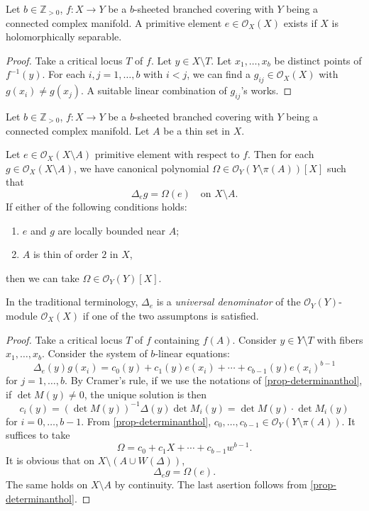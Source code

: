 \begin{corollary}\label{cor-existenceprimi}
    Let $b\in \mathbb{Z}_{>0}$, $f:X\rightarrow Y$ be a $b$-sheeted branched covering with $Y$ being a connected complex manifold. A primitive element $e\in \mathcal{O}_X(X)$ exists if $X$ is holomorphically separable.
\end{corollary}
\begin{proof}
    Take a critical locus $T$ of $f$. 
    Let $y\in X\setminus T$. Let $x_1,\ldots,x_b$ be distinct points of $f^{-1}(y)$. For each $i,j=1,\ldots,b$ with $i<j$, we can find a $g_{ij}\in \mathcal{O}_X(X)$ with $g(x_i)\neq g(x_j)$. A suitable linear combination of $g_{ij}$'s works.
\end{proof}

\begin{proposition}\label{prop-univdenor}
    Let $b\in \mathbb{Z}_{>0}$, $f:X\rightarrow Y$ be a $b$-sheeted branched covering with $Y$ being a connected complex manifold. Let $A$ be a thin set in $X$. 

    Let $e\in \mathcal{O}_X(X\setminus A)$ primitive element with respect to $f$.
    Then for each $g\in \mathcal{O}_X(X\setminus A)$, we have canonical polynomial $\Omega\in \mathcal{O}_Y(Y\setminus \pi(A))[X]$ such that 
    \[
        \Delta_e g=\Omega(e)  \quad \text{on }X\setminus A.
    \]
    If either of the following conditions holds:
    \begin{enumerate}
       \item $e$ and $g$ are locally bounded near $A$;
       \item $A$ is thin of order $2$ in $X$,
    \end{enumerate}
    then we can take $\Omega\in \mathcal{O}_Y(Y)[X]$.
\end{proposition}
In the traditional terminology, $\Delta_e$ is a \emph{universal denominator} of the $\mathcal{O}_Y(Y)$-module $\mathcal{O}_X(X)$ if one of the two assumptons is satisfied.
\begin{proof}
    Take a critical locus $T$ of $f$ containing $f(A)$. 
    Consider $y\in Y\setminus T$ with fibers $x_1,\ldots,x_b$. Consider the system of $b$-linear equations:
    \[
      \Delta_e(y)g(x_i) =c_0(y)+c_1(y)e(x_i)+\cdots+c_{b-1}(y)e(x_i)^{b-1} 
    \]
    for $j=1,\ldots,b$. By Cramer's rule, if we use the notations of \cref{prop-determinanthol}, if $\det M(y)\neq 0$,
    the unique solution is then
    \[
        c_i(y) = (\det M(y))^{-1}\Delta(y)\det M_{i}(y)=\det M(y)\cdot \det M_i(y)
    \]
    for $i=0,\ldots,b-1$. From \cref{prop-determinanthol}, $c_0,\ldots,c_{b-1}\in \mathcal{O}_Y(Y\setminus \pi(A))$. It suffices to take 
    \[
        \Omega=c_0+c_1X+\cdots+c_{b-1}w^{b-1}.  
    \]
    It is obvious that on $X\setminus (A\cup W(\Delta))$, 
    \[
        \Delta_e g=\Omega(e).  
    \]
    The same holds on $X\setminus A$ by continuity. The last asertion follows from \cref{prop-determinanthol}. 
\end{proof}


